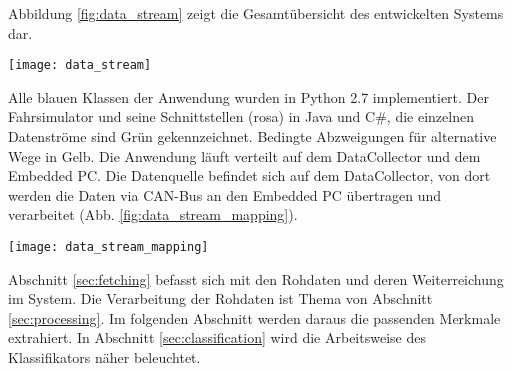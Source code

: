 \label{chap:implementation}

Abbildung \ref{fig:data_stream} zeigt die Gesamtübersicht des entwickelten Systems dar. 
\begin{figure*} 
  \begin{center}
    \texttt{[image: data\_stream]}
    \caption[Aufbau der Anwendung]{Der Aufbau des entwickelten System zur Müdigkeitserkennung. Grün: Datenströme, Blau: Python Klassen der Anwendung, Gelb: bedingte Abzweigungen, Rosa: Klassen der Fahrsimulatorumgebung\label{fig:data_stream}}
  \end{center}
\end{figure*}
Alle blauen Klassen der Anwendung wurden in Python 2.7 implementiert. Der Fahrsimulator und seine Schnittstellen (rosa) in Java und C\#, die einzelnen Datenströme sind Grün gekennzeichnet. Bedingte Abzweigungen für alternative Wege in Gelb. Die Anwendung läuft verteilt auf dem DataCollector und dem Embedded PC. Die Datenquelle befindet sich auf dem DataCollector, von dort werden die Daten via CAN-Bus an den Embedded PC übertragen und verarbeitet (Abb. \ref{fig:data_stream_mapping}). 
\begin{figure*} 
  \begin{center}
    \texttt{[image: data\_stream\_mapping]}
    \caption[Einbettung der Anwendung]{Datenquelle und Verarbeitung sind verteilt im Fahrsimulator eingebettet. Die Übertrageung erfolgt via CAN-Bus. \label{fig:data_stream_mapping}}
  \end{center}
\end{figure*}

\threadingSequence

Abschnitt \ref{sec:fetching} befasst sich mit den Rohdaten und deren Weiterreichung im System. Die Verarbeitung der Rohdaten ist Thema von Abschnitt \ref{sec:processing}. Im folgenden Abschnitt werden daraus die passenden Merkmale extrahiert. In Abschnitt \ref{sec:classification} wird die Arbeitsweise des Klassifikators näher beleuchtet. 


